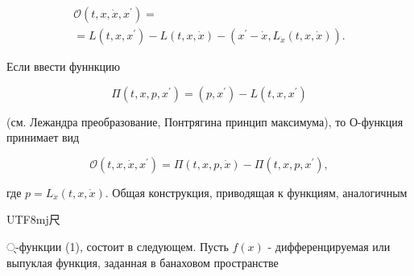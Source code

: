 \documentclass[10pt]{article}
\begin{document}
\[

\begin{gathered}

\mathcal{O}\left(t, x, \dot{x}, x^{\prime}\right)= \\

=L\left(t, x, x^{\prime}\right)-L(t, x, \dot{x})-\left(x^{\prime}-\dot{x}, L_{\dot{x}}(t, x, \dot{x})\right) .

\end{gathered}

\]



Если ввести фуннкцию



\[

\Pi\left(t, x, p, x^{\prime}\right)=\left(p, x^{\prime}\right)-L\left(t, x, x^{\prime}\right)

\]



(см. Лежандра преобразование, Понтрягина принцип максимума), то О-функция принимает вид



\[

\mathscr{O}\left(t, x, \dot{x}, x^{\prime}\right)=\Pi(t, x, p, \dot{x})-\Pi\left(t, x, p, x^{\prime}\right),

\]



где $p=L_{\dot{x}}(t, x, \dot{x})$. Общая конструкция, приводящая к функциям, аналогичным \begin{CJK}{UTF8}{mj}尺\end{CJK}्-функции (1), состоит в следующем. Пусть $f(x)$ - дифференцируемая или выпуклая функция, заданная в банаховом пространстве
\end{document}

